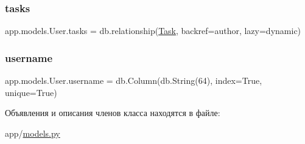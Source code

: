\mbox{\label{classapp_1_1models_1_1_user_a9d486736caa6cb4e1878bf6ec022ba36}} 
\subsubsection{\texorpdfstring{tasks}{tasks}}
{\footnotesize\ttfamily app.\+models.\+User.\+tasks = db.\+relationship(\textquotesingle{}\mbox{\hyperlink{classapp_1_1models_1_1_task}{Task}}\textquotesingle{}, backref=\textquotesingle{}author\textquotesingle{}, lazy=\textquotesingle{}dynamic\textquotesingle{})\hspace{0.3cm}{\ttfamily [static]}}

\mbox{\label{classapp_1_1models_1_1_user_aec05013ad6d15a43fcd996241fc32912}} 
\subsubsection{\texorpdfstring{username}{username}}
{\footnotesize\ttfamily app.\+models.\+User.\+username = db.\+Column(db.\+String(64), index=True, unique=True)\hspace{0.3cm}{\ttfamily [static]}}



Объявления и описания членов класса находятся в файле\+:\begin{DoxyCompactItemize}
\item 
app/\mbox{\hyperlink{models_8py}{models.\+py}}\end{DoxyCompactItemize}
